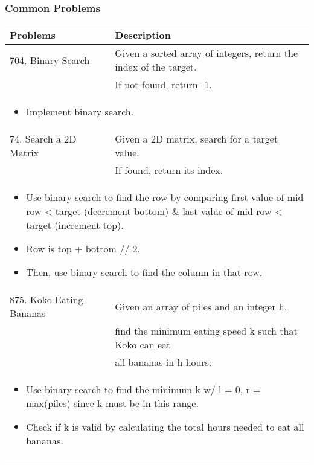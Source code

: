 \subsubsection{Common Problems}
\begin{summary}
    \begin{center}
        \begin{tabular}{ll}
            \toprule
            \textbf{Problems} & \textbf{Description} \\
            \midrule
            704. Binary Search & Given a sorted array of integers, return the index of the target. \\
            & If not found, return -1. \\
            \multicolumn{2}{p{\linewidth}}{
                \begin{itemize}
                    \item Implement binary search.
                \end{itemize}
            } \\
            \midrule
            74. Search a 2D Matrix & Given a 2D matrix, search for a target value. \\
            & If found, return its index. \\
            \multicolumn{2}{p{\linewidth}}{
                \begin{itemize}
                    \item Use binary search to find the row by comparing first value of mid row < target (decrement bottom) \& last value of mid row < target (increment top).
                    \item Row is top + bottom // 2.
                    \item Then, use binary search to find the column in that row.
                \end{itemize}
            } \\
            \midrule
            875. Koko Eating Bananas & Given an array of piles and an integer h, \\
            & find the minimum eating speed k such that Koko can eat \\
            & all bananas in h hours. \\
            \multicolumn{2}{p{\linewidth}}{
                \begin{itemize}
                    \item Use binary search to find the minimum k w/ l = 0, r = max(piles) since k must be in this range.
                    \item Check if k is valid by calculating the total hours needed to eat all bananas.

\end{itemize}}
\end{tabular}
\end{center}
\end{summary}
